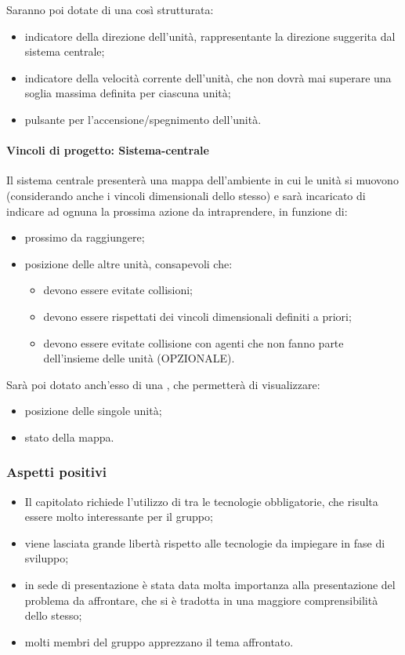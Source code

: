 \documentclass[]{article}
\begin{document}
            \noindent
			Saranno poi dotate di una  così strutturata:
			\begin{itemize}
				\item indicatore della direzione dell'unità, rappresentante la direzione suggerita dal sistema centrale;
				\item indicatore della velocità corrente dell'unità, che non dovrà mai superare una soglia massima definita per ciascuna unità;
				\item pulsante per l'accensione/spegnimento dell'unità.
			\end{itemize}

			\paragraph{Vincoli di progetto: Sistema-centrale}
			Il sistema centrale presenterà una mappa dell'ambiente in cui le unità si muovono (considerando anche i vincoli dimensionali dello stesso) e sarà incaricato di indicare ad ognuna la prossima azione da intraprendere, in funzione di:
			\begin{itemize}
				\item prossimo  da raggiungere;
				\item posizione delle altre unità, consapevoli che:
					\begin{itemize}
						\item devono essere evitate collisioni;
						\item devono essere rispettati dei vincoli dimensionali definiti a priori;
						\item devono essere evitate collisione con agenti che non fanno parte dell'insieme delle unità (OPZIONALE).
					\end{itemize}
			\end{itemize}

            \noindent
			Sarà poi dotato anch'esso di una , che permetterà di visualizzare:
			\begin{itemize}
				\item posizione  delle singole unità;
				\item stato  della mappa.
			\end{itemize}

			\subsubsection{Aspetti positivi}
			\begin{itemize}
				\item Il capitolato richiede l'utilizzo di  tra le tecnologie obbligatorie, che risulta essere molto interessante per il gruppo;
				\item viene lasciata grande libertà rispetto alle tecnologie da impiegare in fase di sviluppo;
				\item in sede di presentazione è stata data molta importanza alla presentazione del problema da affrontare, che si è tradotta in una maggiore comprensibilità dello stesso;
				\item molti membri del gruppo apprezzano il tema affrontato.
			\end{itemize}
\end{document}
